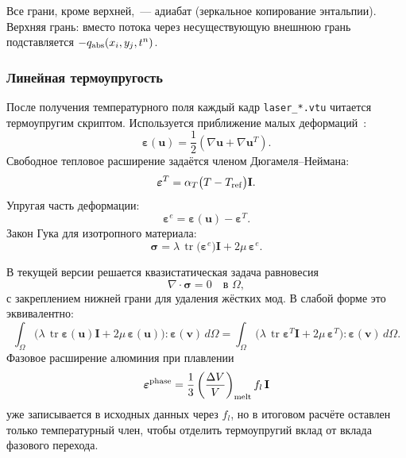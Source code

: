 Все грани, кроме верхней,~--- адиабат (зеркальное копирование энтальпии).
Верхняя грань: вместо потока через несуществующую внешнюю грань
подставляется $-q_{\rm abs}(x_i, y_j, t^n)$.

\subsubsection{Линейная термоупругость}

После получения температурного поля каждый кадр \texttt{laser\_*.vtu}
читается термоупругим скриптом. Используется приближение малых
деформаций~\cite{biot1956}:
\begin{equation}
  \boldsymbol{\varepsilon}(\mathbf{u})
  = \frac{1}{2}\left(\nabla \mathbf{u}
  + \nabla \mathbf{u}^{T}\right).
\end{equation}
Свободное тепловое расширение задаётся членом Дюгамеля--Неймана:
\begin{equation}
  \boldsymbol{\varepsilon}^{T}
  = \alpha_T\bigl(T - T_{\rm ref}\bigr)\mathbf{I}.
\end{equation}
Упругая часть деформации:
\begin{equation}
  \boldsymbol{\varepsilon}^{e}
  = \boldsymbol{\varepsilon}(\mathbf{u})
  - \boldsymbol{\varepsilon}^{T}.
\end{equation}
Закон Гука для изотропного материала:
\begin{equation}
  \boldsymbol{\sigma}
  = \lambda\,\operatorname{tr}
    \bigl(\boldsymbol{\varepsilon}^{e}\bigr)\mathbf{I}
  + 2\mu\,\boldsymbol{\varepsilon}^{e}.
\end{equation}

В текущей версии решается квазистатическая задача равновесия
\begin{equation}
  \nabla\cdot\boldsymbol{\sigma} = 0
  \quad \text{в } \Omega,
\end{equation}
с закреплением нижней грани для удаления жёстких мод. В слабой форме
это эквивалентно:
\begin{equation}
  \int_\Omega
  \bigl(\lambda\,\operatorname{tr}\boldsymbol{\varepsilon}(\mathbf{u})\mathbf{I}
  + 2\mu\,\boldsymbol{\varepsilon}(\mathbf{u})\bigr)
  : \boldsymbol{\varepsilon}(\mathbf{v})\,d\Omega
  =
  \int_\Omega
  \bigl(\lambda\,\operatorname{tr}\boldsymbol{\varepsilon}^{T}\mathbf{I}
  + 2\mu\,\boldsymbol{\varepsilon}^{T}\bigr)
  : \boldsymbol{\varepsilon}(\mathbf{v})\,d\Omega.
\end{equation}
Фазовое расширение алюминия при плавлении
\[
  \boldsymbol{\varepsilon}^{\rm phase}
  = \frac{1}{3}\left(\frac{\Delta V}{V}\right)_{\rm melt}
    f_l\,\mathbf{I}
\]
уже записывается в исходных данных через $f_l$, но в итоговом расчёте
оставлен только температурный член, чтобы отделить термоупругий вклад
от вклада фазового перехода.

